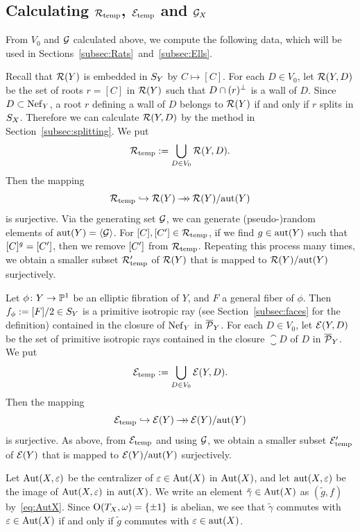 \documentclass{amsart}
\numberwithin{procedure}{section}
\begin{document}
\subsection{Calculating  $\Rats_{\temp}$, $\Ells_{\temp}$  and $\GGG_X$}
\label{subsec:RRREEEtemp}
%
From  $V_0$ and $\GGG$ calculated above,
we compute the following data,
which will be used in Sections~\ref{subsec:Rats}~and~\ref{subsec:Ells}. 
\par
%
Recall that $\Rats(Y)$ is embedded in $\SY$ 
by $C\mapsto [C]$.
For each $D\in V_0$,
let $\Rats(Y, D)$ be the set of roots $r=[C]$ in $\Rats(Y)$
such that  $D\cap (r)\sperp$ is a wall of $D$.
Since $D\subset\NefY$, 
a root $r$ defining a wall of $D$ belongs to $\Rats(Y)$ 
if and only if $r$ splits in $\SX$.
Therefore 
we can calculate $\Rats(Y, D)$ by the method
in Section~\ref{subsec:splitting}.
We put
\[
\Rats_{\temp}:=\bigcup_{D\in V_0} \Rats(Y, D).
\]
Then the mapping
\[
\Rats_{\temp}\inj \Rats(Y)\surj \Rats(Y)/\aut(Y)
\]
is surjective.
Via the generating set $\GGG$,
we can generate (pseudo-)random elements of $\aut(Y)=\gen{\GGG}$.
For $[C], [C\sprime]\in \Rats_{\temp}$,
if we find  $g\in \aut(Y)$
such that $[C]^g=[C\sprime]$,
then we remove $[C\sprime]$ from $\Rats_{\temp}$.
Repeating this process many times, 
we obtain a smaller subset $\Rats_{\temp}\sprime$ of $\Rats(Y)$
that is mapped to $\Rats(Y)/\aut(Y)$
surjectively.
\par
Let $\phi\colon Y\to \P^1$ be an elliptic fibration of  $Y$,
and $F$ a  general fiber of $\phi$.
Then   $f_{\phi}:=[F]/2 \in \SY$
is a primitive isotropic ray  (see Section~\ref{subsec:faces} for the definition)
contained in the closure of $\NefY$ in $\closure{\PPP}_Y$.
For each $D\in V_0$,
let $\Ells(Y, D)$ be the set of primitive isotropic rays
contained in the closure $\closure{D}$ of $D$ in $\closure{\PPP}_Y$.
We put
\[
\Ells_{\temp}:=\bigcup_{D\in V_0} \Ells(Y, D).
\]
Then the mapping
\[
\Ells_{\temp}\inj \Ells(Y)\surj \Ells(Y)/\aut(Y)
\]
is surjective.
As above,
from  $\Ells_{\temp}$ and  using  $\GGG$,
we  obtain a smaller subset $\Ells_{\temp}\sprime$ of $\Ells(Y)$
that is mapped to $\Ells(Y)/\aut(Y)$
surjectively.
%
\par
%
Let  $\Aut(X, \enrinvol)$ be the centralizer of $\enrinvol\in \Aut(X)$ in $\Aut(X)$, 
and let $\aut(X, \enrinvol)$ be the image of $\Aut(X, \enrinvol)$ in $\aut(X)$.
We write an element $\tilde{\gamma}\in \Aut(X)$ as $(\tilde{g}, f)$ by~\eqref{eq:AutX}.
Since $\OG(T_X, \period)=\{\pm 1\}$ is abelian,
we see that $\tilde{\gamma}$ commutes with $\enrinvol\in \Aut(X)$
if and only if $\tilde{g}$ commutes with $\enrinvol\in \aut(X)$.
\end{document}
